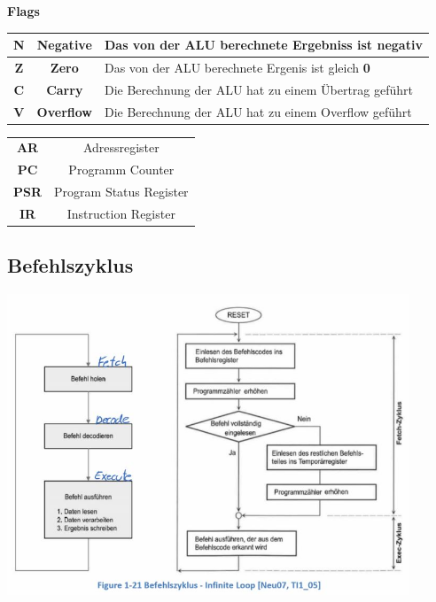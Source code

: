 \begin{multicols}{2}
\begin{minipage}{8cm}
\textbf{Flags}\newline
\begin{tabular}{|c|c|l|}
    \hline 
    \textbf{N}  & \textbf{Negative} & Das von der ALU berechnete Ergebniss ist negativ \\ 
    \hline 
    \textbf{Z}  & \textbf{Zero} & Das von der ALU berechnete Ergenis ist gleich \textbf{0} \\ 
    \hline 
    \textbf{C}  &\textbf{Carry}  &Die Berechnung der ALU hat zu einem Übertrag geführt  \\ 
    \hline 
    \textbf{V}  &\textbf{Overflow}  & Die Berechnung der ALU hat zu einem Overflow geführt  \\ 
    \hline 
\end{tabular} 
\end{minipage}

\begin{minipage}{5cm}
    \begin{tabular}{c|c}
        \textbf{AR}&Adressregister  \\ 
        \textbf{PC}&Programm Counter  \\ 
        \textbf{PSR}& Program Status Register \\ 
        \textbf{IR}& Instruction Register  \\ 
    \end{tabular} 
\end{minipage}
\end{multicols}

\subsection{Befehlszyklus}
    \includegraphics[height=9cm]{images/CommandFlowChart}





















    
